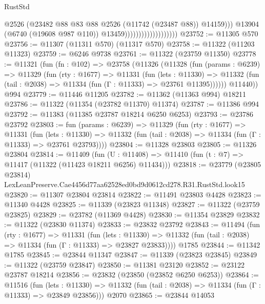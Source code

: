 \begin{lexlean}{RustStd}
\begin{coremodule}
                                              @2526
                                              (@23482
                                                @88
                                                @83
                                                @88
                                                @2526
                                                (@11742 (@23487 @88))
                                                @14159)))
                                          @13904
                                          (@6740 (@19608 @987 @110))
                                          @13459)))))))))))))))))))
@23752 := @11305 @570
@23756 := @11307 (@11311 @570) (@11317 @570)
@23758 := @11322 (@11203 @11323)
@23759 := @6246 @9738
@23761 := @11322 (@23759 @11350)
@23778 := @11321
    (fun (fn : @102) =>
    @23758
      (@11326
        (@11328
          (fun (params : @6239) =>
          @11329
            (fun (rty : @1677) =>
            @11331
              (fun (lets : @11330) =>
              @11332 (fun (tail : @2038) => @11334 (fun (Γ : @11333) => @23761 @11395))))))
        @11440))
    @994
@23779 := @11446 @11205
@23782 := @11362 (@11363 @994) @18211
@23786 := @11322 (@11354 (@23782 @11370) @11374)
@23787 := @11386 @994
@23792 := @11383 (@11385 @23787 @18214 @6250 @6253)
@23793 := @23786 @23792
@23803 := fun (params : @6239) =>
  @11329
    (fun (rty : @1677) =>
    @11331
      (fun (lets : @11330) =>
      @11332 (fun (tail : @2038) => @11334 (fun (Γ : @11333) => @23761 @23793))))
@23804 := @11328 @23803
@23805 := @11326 @23804
@23814 := @11409
    (fun (U : @11408) => @11410 (fun (t : @7) => @11417 (@11322 (@11423 @18211 @6256) @11434)))
@23818 := @23779
    (@23805 @23814)
    LexLeanPreserve.Cae4456d77aa62528ed0bd9d0612cd278.R31.RustStd.look15
@23820 := @11307 @23804 @23814
@23822 := @11491 @23803 @4428
@23823 := @11340 @4428
@23825 := @11339 (@23823 @11348)
@23827 := @11322 (@23759 @23825)
@23829 := @23782 (@11369 @4428)
@23830 := @11354 @23829
@23832 := @11322 (@23830 @11374)
@23833 := @23832 @23792
@23843 := @11494
    (fun (rty : @1677) =>
    @11331
      (fun (lets : @11330) =>
      @11332 (fun (tail : @2038) => @11334 (fun (Γ : @11333) => @23827 @23833))))
    @1785
@23844 := @11342 @1785
@23845 := @23844 @11347
@23847 := @11339 (@23823 @23845)
@23849 := @11322 (@23759 @23847)
@23850 := @11381 @23120
@23852 := @23122 @23787 @18214
@23856 := @23832 (@23850 (@23852 @6250 @6253))
@23864 := @11516
    (fun (lets : @11330) =>
    @11332 (fun (tail : @2038) => @11334 (fun (Γ : @11333) => @23849 @23856)))
    @2070
@23865 := @23844 @14053

\end{coremodule}
\end{lexlean}
